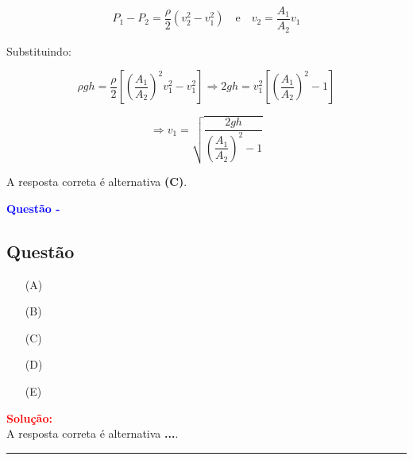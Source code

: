\begin{flushleft}
\[
P_1 - P_2 = \frac{\rho}{2}(v_2^2 - v_1^2) \quad \text{e} \quad v_2 = \frac{A_1}{A_2} v_1
\]

Substituindo:

\[
\rho g h = \frac{\rho}{2} \left[ \left( \frac{A_1}{A_2} \right)^2 v_1^2 - v_1^2 \right]
\Rightarrow 2gh = v_1^2 \left[ \left( \frac{A_1}{A_2} \right)^2 - 1 \right]
\]

\[
\Rightarrow v_1 = \sqrt{ \frac{2gh}{\left( \dfrac{A_1}{A_2} \right)^2 - 1} }
\]

A resposta correta é alternativa \colorbox{green!50}{\textbf{(C)}}.

\end{flushleft}





\begin{flushleft}
\textbf{\textcolor{blue}{\Large Quest\~ao - }}\\
\noindent

\subsection{Quest\~ao }

\begin{itemize}
\item[(A)] 
\item[(B)] 
\item[(C)]
\item[(D)] 
\item[(E)] 
\end{itemize}

\vspace{0.5cm}

\textcolor{red}{\textbf{Solução:}}\\


A resposta correta é alternativa \colorbox{green!50}{\textbf{...}}.

\end{flushleft}

\noindent\rule{\linewidth}{0.6pt}\\
